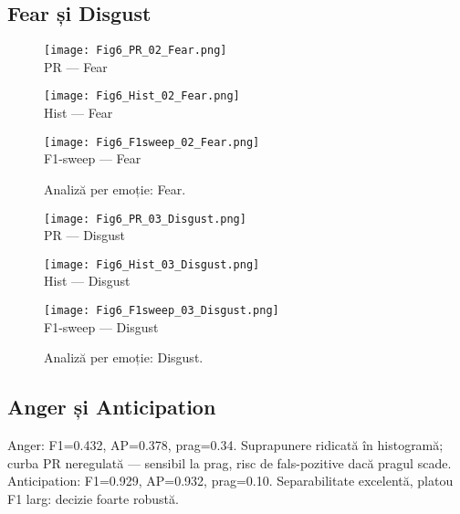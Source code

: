 \subsection{Fear și Disgust}
\begin{figure}[H]
  \centering
  \begin{minipage}[t]{0.32\textwidth}\centering
    \texttt{[image: Fig6\_PR\_02\_Fear.png]}\\[-1mm]
    {\scriptsize PR — Fear}
  \end{minipage}\hfill
  \begin{minipage}[t]{0.32\textwidth}\centering
    \texttt{[image: Fig6\_Hist\_02\_Fear.png]}\\[-1mm]
    {\scriptsize Hist — Fear}
  \end{minipage}\hfill
  \begin{minipage}[t]{0.32\textwidth}\centering
    \texttt{[image: Fig6\_F1sweep\_02\_Fear.png]}\\[-1mm]
    {\scriptsize F1-sweep — Fear}
  \end{minipage}
  \caption{Analiză per emoție: Fear.}
  \label{fig:c6-fear}
\end{figure}

\begin{figure}[H]
  \centering
  \begin{minipage}[t]{0.32\textwidth}\centering
    \texttt{[image: Fig6\_PR\_03\_Disgust.png]}\\[-1mm]
    {\scriptsize PR — Disgust}
  \end{minipage}\hfill
  \begin{minipage}[t]{0.32\textwidth}\centering
    \texttt{[image: Fig6\_Hist\_03\_Disgust.png]}\\[-1mm]
    {\scriptsize Hist — Disgust}
  \end{minipage}\hfill
  \begin{minipage}[t]{0.32\textwidth}\centering
    \texttt{[image: Fig6\_F1sweep\_03\_Disgust.png]}\\[-1mm]
    {\scriptsize F1-sweep — Disgust}
  \end{minipage}
  \caption{Analiză per emoție: Disgust.}
  \label{fig:c6-disgust}
\end{figure}

\subsection{Anger și Anticipation}
\noindent Anger: F1=0.432, AP=0.378, prag=0.34. Suprapunere ridicată în histogramă; curba PR neregulată — sensibil la prag, risc de fals-pozitive dacă pragul scade.
\noindent Anticipation: F1=0.929, AP=0.932, prag=0.10. Separabilitate excelentă, platou F1 larg: decizie foarte robustă.

